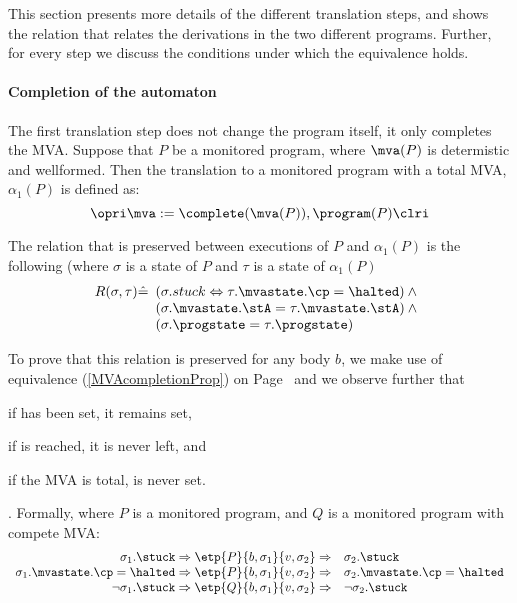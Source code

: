 This section presents more details of the different translation steps,
and shows the relation that relates the derivations in the two
different programs. Further, for every step we discuss the conditions
under which the equivalence holds.



\paragraph{Completion of the automaton}
The first translation step does not change the program itself, it only
completes the MVA.  Suppose that \(P\) be a monitored program, where
\(\mva(P)\) is determistic and wellformed. Then the translation to a
monitored program with a total MVA, \(\alpha_1(P)\) is defined as:
\[
\opri \mva := \complete(\mva(P)), \program(P) \clri
\]

The relation that is preserved between executions of \(P\) and
\(\alpha_1(P)\) is the following (where \(\sigma\) is a state of
\(P\) and \(\tau\) is a state of \(\alpha_1(P)\)
\[R(\sigma, \tau) \hat=
 \begin{array}[t]{l}
  (\sigma.stuck \Leftrightarrow \tau.\mvastate.\cp = \halted) \:\wedge \\
  (\sigma.\mvastate.\stA = \tau.\mvastate.\stA) \:\wedge \\
  (\sigma.\progstate = \tau.\progstate)
\end{array}
\]

To prove that this relation is preserved for any body \(b\), we make
use of equivalence (\ref{MVAcompletionProp}) on
Page~\pageref{MVAcompletionProp} and we observe further that
\begin{inparaenum}
\item if \stuck has been set, it remains set,
\item if \halted is reached, it is never left, and
\item if the MVA is total, \stuck is never set.
\end{inparaenum}. Formally, where \(P\) is a monitored program, and
\(Q\) is a monitored program with compete MVA:
\[
\begin{array}[t]{rl}
\sigma_1.\stuck \Rightarrow
\etp{P}{b,\sigma_1}{v,\sigma_2} \Rightarrow & 
\sigma_2.\stuck \\
\sigma_1.\mvastate.\cp = \halted \Rightarrow
\etp{P}{b,\sigma_1}{v,\sigma_2} \Rightarrow &
\sigma_2.\mvastate.\cp = \halted \\
\neg \sigma_1.\stuck \Rightarrow
\etp{Q}{b,\sigma_1}{v,\sigma_2} \Rightarrow &
\neg \sigma_2.\stuck 
\end{array}
\]

